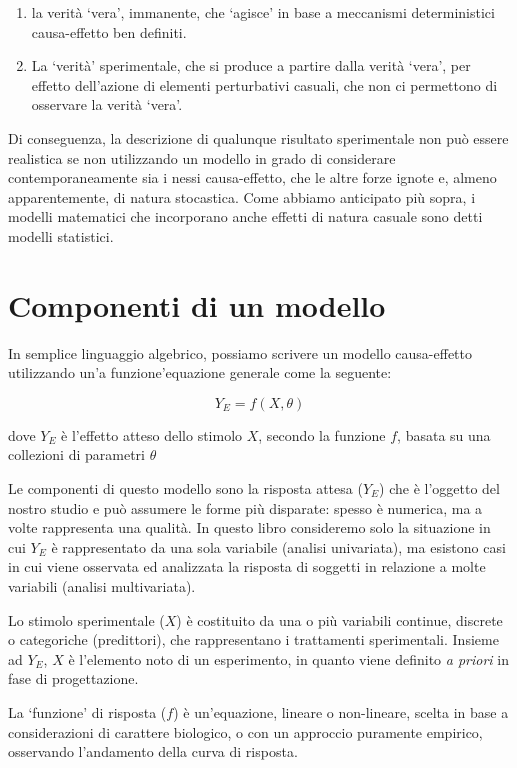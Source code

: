 \documentclass[
  12pt,
]{book}
\providecommand{\tightlist}{%
  \setlength{\itemsep}{0pt}\setlength{\parskip}{0pt}}
\begin{document}
\begin{enumerate}
\def\labelenumi{\arabic{enumi}.}
\tightlist
\item
  la verità `vera', immanente, che `agisce' in base a meccanismi deterministici causa-effetto ben definiti.
\item
  La `verità' sperimentale, che si produce a partire dalla verità `vera', per effetto dell'azione di elementi perturbativi casuali, che non ci permettono di osservare la verità `vera'.
\end{enumerate}

Di conseguenza, la descrizione di qualunque risultato sperimentale non può essere realistica se non utilizzando un modello in grado di considerare contemporaneamente sia i nessi causa-effetto, che le altre forze ignote e, almeno apparentemente, di natura stocastica. Come abbiamo anticipato più sopra, i modelli matematici che incorporano anche effetti di natura casuale sono detti modelli statistici.

\hypertarget{componenti-di-un-modello}{%
\section{Componenti di un modello}\label{componenti-di-un-modello}}

In semplice linguaggio algebrico, possiamo scrivere un modello causa-effetto utilizzando un'a funzione'equazione generale come la seguente:

\[ Y_E = f(X, \theta)\]

dove \(Y_E\) è l'effetto atteso dello stimolo \(X\), secondo la funzione \(f\), basata su una collezioni di parametri \(\theta\)

Le componenti di questo modello sono la risposta attesa (\(Y_E\)) che è l'oggetto del nostro studio e può assumere le forme più disparate: spesso è numerica, ma a volte rappresenta una qualità. In questo libro consideremo solo la situazione in cui \(Y_E\) è rappresentato da una sola variabile (analisi univariata), ma esistono casi in cui viene osservata ed analizzata la risposta di soggetti in relazione a molte variabili (analisi multivariata).

Lo stimolo sperimentale (\(X\)) è costituito da una o più variabili continue, discrete o categoriche (predittori), che rappresentano i trattamenti sperimentali. Insieme ad \(Y_E\), \(X\) è l'elemento noto di un esperimento, in quanto viene definito \emph{a priori} in fase di progettazione.

La `funzione' di risposta (\(f\)) è un'equazione, lineare o non-lineare, scelta in base a considerazioni di carattere biologico, o con un approccio puramente empirico, osservando l'andamento della curva di risposta.
\end{document}
